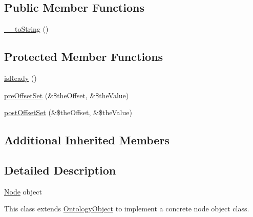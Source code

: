 \subsection*{Public Member Functions}
\begin{DoxyCompactItemize}
\item 
\hyperlink{class_ontology_wrapper_1_1_node_object_a4c43405afb19db7efd697d277e22e5f5}{\-\_\-\-\_\-to\-String} ()
\end{DoxyCompactItemize}
\subsection*{Protected Member Functions}
\begin{DoxyCompactItemize}
\item 
\hyperlink{class_ontology_wrapper_1_1_node_object_ad128343f755254af0a45d8f92fc60e9a}{is\-Ready} ()
\item 
\hyperlink{class_ontology_wrapper_1_1_node_object_a3ac20a9110b88a30bb3fd40adf7e6c44}{pre\-Offset\-Set} (\&\$the\-Offset, \&\$the\-Value)
\item 
\hyperlink{class_ontology_wrapper_1_1_node_object_a9c953999e56dbcfa4b5ab669464acc1a}{post\-Offset\-Set} (\&\$the\-Offset, \&\$the\-Value)
\end{DoxyCompactItemize}
\subsection*{Additional Inherited Members}


\subsection{Detailed Description}
\hyperlink{class_ontology_wrapper_1_1_node}{Node} object

This class extends \hyperlink{class_ontology_wrapper_1_1_ontology_object}{Ontology\-Object} to implement a concrete node object class.

